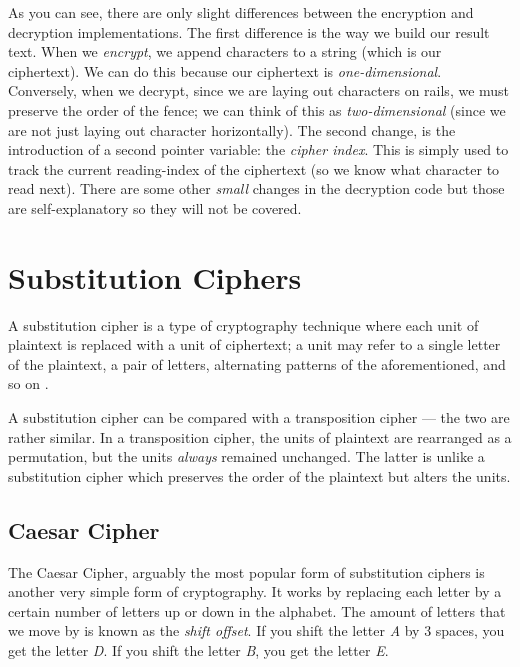 As you can see, there are only slight differences between the encryption and decryption implementations. The first difference is the
way we build our result text. When we \textit{encrypt}, we append characters to a string (which is our ciphertext). We can do this because
our ciphertext is \textit{one-dimensional}. Conversely, when we decrypt, since we are laying out characters on rails, we must preserve the order of the
fence; we can think of this as \textit{two-dimensional} (since we are not just laying out character horizontally). 
The second change, is the introduction of a second pointer variable: the \textit{cipher index}. 
This is simply used to track the current reading-index of the ciphertext (so we know what character to read next). 
There are some other \textit{small} changes in the decryption code but those are self-explanatory so they will not be covered.

\section{Substitution Ciphers}

A substitution cipher is a type of cryptography technique where each unit of plaintext is replaced with a unit of ciphertext; a unit may refer to a single
letter of the plaintext, a pair of letters, alternating patterns of the aforementioned, and so on \cite{wiki:substitution_cipher}.

A substitution cipher can be compared with a transposition cipher --- the two are rather similar. In a transposition cipher, the units of plaintext are rearranged as a
permutation, but the units \textit{always} remained unchanged. The latter is unlike a substitution cipher which preserves the order of the plaintext but alters
the units.

\subsection{Caesar Cipher}
The Caesar Cipher, arguably the most popular form of substitution ciphers is another very simple form of cryptography. 
It works by replacing each letter by a certain number of letters up or down in the alphabet. The amount of 
letters that we move by is known as the \textit{shift offset}. If you shift the letter \textit{A} by 3 spaces, you get 
the letter \textit{D}. If you shift the letter \textit{B}, you get the letter \textit{E}.

